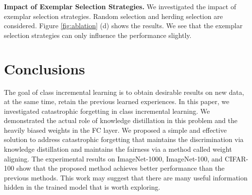 \documentclass[10pt,twocolumn,letterpaper]{article}
\begin{document}
\noindent\textbf{Impact of Exemplar Selection Strategies.} We investigated the impact of exemplar selection strategies. Random selection and herding selection are considered. Figure \ref{fig:ablation} (d) shows the results. We see that the exemplar selection strategies can only influence the performance slightly.


\section{Conclusions}\label{sec:conclusion}
The goal of class incremental learning is to obtain desirable results on new data, at the same time, retain the previous learned experiences. In this paper, we investigated catastrophic forgetting in class incremental learning. We demonstrated the actual role of knowledge distillation in this problem and the heavily biased weights in the FC layer. We proposed a simple and effective solution to address catastrophic forgetting that maintains the discrimination via knowledge distillation and maintains the fairness via a method called weight aligning. The experimental results on ImageNet-1000, ImageNet-100, and CIFAR-100 show that the proposed method achieves better performance than the previous methods. This work may suggest that there are many useful information hidden in the trained model that is worth exploring.



{\small


}
\end{document}

